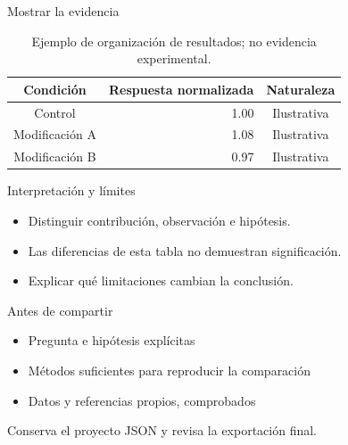 \documentclass[aspectratio=169,11pt]{beamer}
\begin{document}
\begin{frame}{Mostrar la evidencia}
  \transdissolve[duration=0.25]
  \begin{table}
    \centering
    \caption{Ejemplo de organización de resultados; no evidencia experimental.}
    \begin{tabular}{crc}
      \toprule
      \textbf{Condición} & \textbf{Respuesta normalizada} & \textbf{Naturaleza} \\
      \midrule
      Control & 1.00 & Ilustrativa \\
      Modificación A & 1.08 & Ilustrativa \\
      Modificación B & 0.97 & Ilustrativa \\
      \bottomrule
    \end{tabular}
  \end{table}
\end{frame}

\begin{frame}{Interpretación y límites}
  \transdissolve[duration=0.25]
  \begin{itemize}
    \item Distinguir contribución, observación e hipótesis.
    \item Las diferencias de esta tabla no demuestran significación.
    \item Explicar qué limitaciones cambian la conclusión.
  \end{itemize}
\end{frame}

\begin{frame}{Antes de compartir}
  \transdissolve[duration=0.25]
  \begin{itemize}
    \item Pregunta e hipótesis explícitas
    \item Métodos suficientes para reproducir la comparación
    \item Datos y referencias propios, comprobados
  \end{itemize}
  \medskip

  {\small Conserva el proyecto JSON y revisa la exportación final.}
\end{frame}
\end{document}
